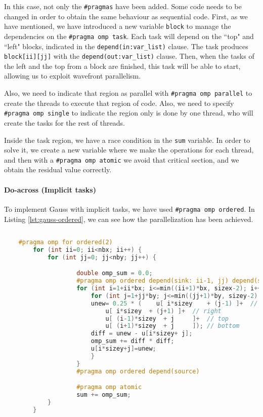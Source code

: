 \documentclass[a4paper, 10pt]{article}
\begin{document}
  In this case, not only the \texttt{\#pragmas} have been added. Some code needs to be changed in order to obtain the same behaviour as sequential code. First, as we have mentioned, we have introduced a new variable \texttt{block} to manage the dependencies on the \texttt{\#pragma omp task}. Each task will depend on the ``top" and ``left" blocks, indicated in the \texttt{depend(in:var\_list)} clause. The task produces \texttt{block[ii][jj]} with the \texttt{depend(out:var\_list)} clause. Then, when the tasks of the left and the top from a block are finished, this task will be able to start, allowing us to exploit wavefront parallelism.

  Also, we need to indicate that region as parallel with \texttt{\#pragma omp parallel} to create the threads to execute that region of code. Also, we need to specify \texttt{\#pragma omp single} to indicate the region only is done by one thread, who will create the tasks for the rest of threads. 

  Inside the task region, we have a race condition in the \texttt{sum} variable. In order to solve it, we create a new variable where we make the operations for each thread, and then with a \texttt{\#pragma omp atomic} we avoid that critical section, and we obtain the residual value correctly.


\clearpage
\paragraph{Do-across (Implicit tasks)\\}


To implement Gauss with implicit tasks, we have used \texttt{\#pragma omp ordered}. In Listing \ref{lst:gauss-ordered}, we can see how the parallelization has been achieved.

\begin{lstlisting}[language=c, caption={OpenMP pragma for Gauss-Seidel parallelization}, label={lst:gauss-ordered}]
    
    #pragma omp for ordered(2)
        for (int ii=0; ii<nbx; ii++) {
            for (int jj=0; jj<nby; jj++) {

                    double omp_sum = 0.0;
                    #pragma omp ordered depend(sink: ii-1, jj) depend(sink: ii, jj-1)
                    for (int i=1+ii*bx; i<=min((ii+1)*bx, sizex-2); i++) {
                        for (int j=1+jj*by; j<=min((jj+1)*by, sizey-2); j++) {
                        unew= 0.25 * (    u[ i*sizey	+ (j-1) ]+  // left
                            u[ i*sizey	+ (j+1) ]+  // right
                            u[ (i-1)*sizey	+ j     ]+  // top
                            u[ (i+1)*sizey	+ j     ]); // bottom
                        diff = unew - u[i*sizey+ j];
                        omp_sum += diff * diff; 
                        u[i*sizey+j]=unew;
                        } 
                    }
                    #pragma omp ordered depend(source)

                    #pragma omp atomic
                    sum += omp_sum;
            }
        }
    
    \end{lstlisting}
\end{document}

